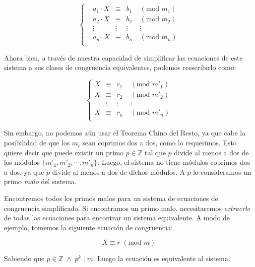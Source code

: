 \documentclass{article}
\newcommand{\nln}{\par\vspace{3mm}}
\begin{document}
\begin{equation} \label{modularEquationSystem}
\left\{\begin{matrix}
 &a_1 \cdot X &\equiv &b_1 \; &(\text{mod } m_1)  \\
 &a_2 \cdot X &\equiv &b_2 \; &(\text{mod } m_2)  \\
 &\vdots      &\vdots &\vdots &\vdots             \\
 &a_n \cdot X &\equiv &b_n \; &(\text{mod } m_n)  \\
\end{matrix}\right.
\end{equation}
\nln

Ahora bien, a través de nuestra capacidad de simplificar las ecuaciones de este sistema a sus clases de congruencia equivalentes, podemos reescribirlo como:

\begin{equation}
\left\{\begin{matrix} \label{modularEquationSystemSimplified}
 X &\equiv &r_1 \; &(\text{mod } {m'}_1)  \\
 X &\equiv &r_2 \; &(\text{mod } {m'}_2)  \\
 &\vdots   &\vdots &\vdots                \\
 X &\equiv &r_n \; &(\text{mod } {m'}_n)  \\
\end{matrix}\right.
\end{equation}
\nln

Sin embargo, no podemos aún usar el Teorema Chino del Resto, ya que cabe la posibilidad de que los $m_i$ sean coprimos dos a dos, como lo requerimos. Esto quiere decir que puede existir un primo $p \in \mathbb{Z}$ tal que $p$ divide al menos a dos de los módulos $\{{m'}_1, {m'}_2, \cdots, {m'}_n\}$. Luego, el sistema no tiene módulos coprimos dos a dos, ya que $p$ divide al menos a dos de dichos módulos. A $p$ lo consideramos un primo \textit{malo} del sistema.
\nln
Encontremos todos los primos malos para un sistema de ecuaciones de congruencia simplificado. Si encontramos un primo malo, necesitaremos \textit{extraerlo} de todas las ecuaciones para encontrar un sistema equivalente. A modo de ejemplo, tomemos la siguiente ecuación de congruencia:

\begin{equation*}
    X \equiv r \; (\text{mod } m)
\end{equation*}

Sabiendo que $p \in \mathbb{Z} \;\land\; p^k \mid m$. Luego la ecuación es equivalente al sistema:
\end{document}
